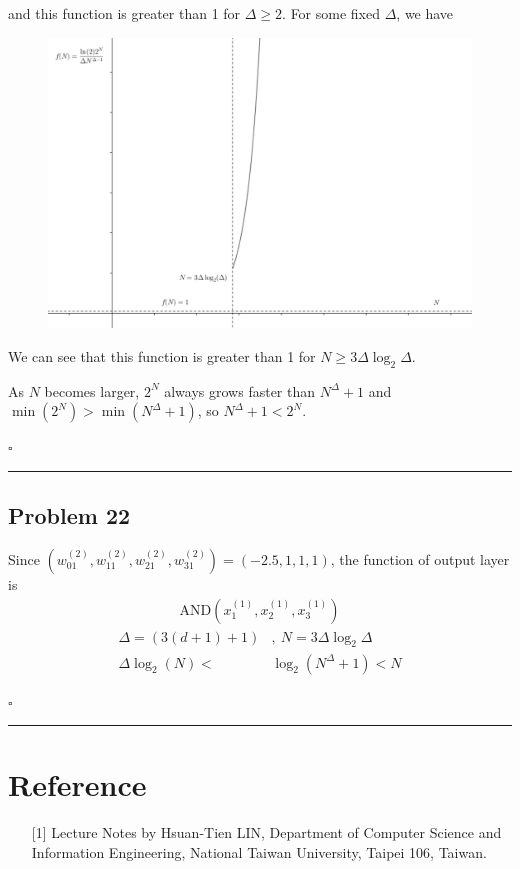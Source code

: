 \documentclass[12pt]{article}
\newcommand*{\QEDB}{\hfill\ensuremath{\square}}
\newcommand{\ParTh}[1]{\left(#1\right)}
\newcommand{\horrule}[1]{\rule{\linewidth}{#1}}
\begin{document}
and this function is greater than 1 for $\Delta\geq2$. For some fixed $\Delta$, we have
\begin{figure}[H]
	\centering
	\includegraphics[scale=0.4]{21-2.png}
\end{figure}
We can see that this function is greater than 1 for $N\geq3\Delta\log_2\Delta$.

As $N$ becomes larger, $2^N$ always grows faster than $N^{\Delta}+1$ and $\min\ParTh{2^N}>\min\ParTh{N^\Delta+1}$, so $N^\Delta+1<2^N$.

\QEDB

\horrule{0.5pt}

\subsection*{Problem 22}

Since $\ParTh{w^{\ParTh{2}}_{01},w^{\ParTh{2}}_{11},w^{\ParTh{2}}_{21},w^{\ParTh{2}}_{31}}=\ParTh{-2.5,1,1,1}$, the function of output layer is
\begin{align}
\text{AND}\ParTh{x^{\ParTh{1}}_1,x^{\ParTh{1}}_2,x^{\ParTh{1}}_3}
\end{align}
\begin{align}
\Delta=\ParTh{3\ParTh{d+1}+1}&,~N=3\Delta\log_2\Delta\\
\Delta\log_2\ParTh{N}<&\log_2\ParTh{N^\Delta+1}<N
\end{align}

\QEDB

\horrule{0.5pt}

\section*{Reference}

\begin{enumerate}

\item[{[1]}] Lecture Notes by Hsuan-Tien LIN, Department of Computer Science and Information Engineering, National Taiwan University, Taipei 106, Taiwan.

\end{enumerate}
\end{document}
